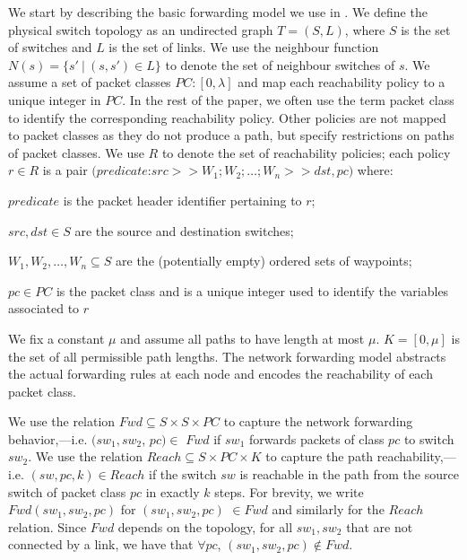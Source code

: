 We start by describing the basic forwarding model we use in \Name.
We define the physical switch topology as an undirected graph $T=(S, L)$,
where $S$ is the set of switches and $L$ is the set of links. 
We use the neighbour function $N(s) = \{s'\ | \ (s,s') \in L \}$ to denote 
the set of neighbour switches of $s$. 
We assume a set of packet classes $PC : [0,\lambda]$ 
and map each reachability policy to a unique integer in $PC$. In the rest of the paper, 
we often use the term packet class to identify the corresponding reachability policy. 
Other policies are not mapped to packet classes as they do not produce a path, but specify restrictions on paths of packet classes. 
We use $R$ to denote the set of reachability policies; each policy $r \in R$ is
a pair
$(predicate$:$src >> W_1;W_2; \ldots; W_n >> dst, pc)$ where:
\begin{compactitemize}
\item  $predicate$ is the packet header identifier pertaining to $r$;
\item  $src,dst \in S$ are the source and destination switches;
\item $W_1, W_2, \ldots, W_n \subseteq S$ are the (potentially empty) ordered sets of waypoints; 
\item $pc \in PC$ is the packet class and is a unique integer used to identify the variables associated to $r$
\end{compactitemize} 
We fix a constant $\mu$ and assume all paths to have length at most $\mu$. 
$K=[0,\mu]$ is the set of all permissible path lengths. The network forwarding
 model abstracts the actual forwarding rules at each node and encodes 
 the reachability of each packet class. 
 
We use the relation $Fwd \subseteq S \times S \times PC $  to capture 
the network forwarding behavior,---i.e. 
$(sw_1, sw_2$, $pc)\in$ $Fwd$ if 
$sw_1$ forwards packets of class $pc$ to switch $sw_2$. 
	We use the relation $Reach \subseteq S \times PC \times K$ to capture
	 the path reachability,---i.e. $(sw, pc, k)\in Reach$ if 
	the switch $sw$ is reachable in the path from the source
	 switch of packet class $pc$ in exactly $k$ steps.  
For brevity, we write $Fwd(sw_1, sw_2, pc)$ for $(sw_1, sw_2, pc) $ $\in Fwd$ and similarly for the $Reach$ relation. 
Since $Fwd$ depends on the topology,
for all $sw_1, sw_2$ that are not connected by a link, 
we have that $\forall pc$, $(sw_1,sw_2,pc) \notin Fwd$. 

